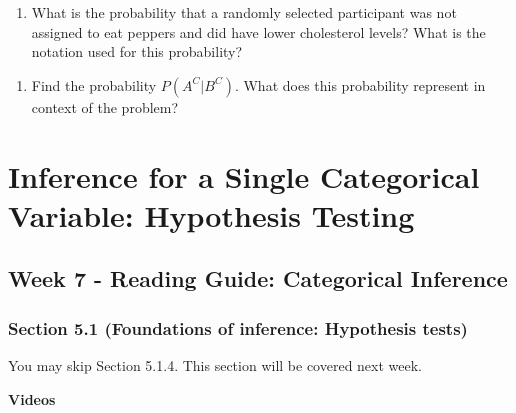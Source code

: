 \documentclass[
]{report}
\providecommand{\tightlist}{%
  \setlength{\itemsep}{0pt}\setlength{\parskip}{0pt}}
\begin{document}
\vspace{0.5in}

\begin{enumerate}
\def\labelenumi{\alph{enumi}.}
\setcounter{enumi}{3}
\tightlist
\item
  What is the probability that a randomly selected participant was not assigned to eat peppers and did have lower cholesterol levels? What is the notation used for this probability?
\end{enumerate}

\vspace{0.5in}

\begin{enumerate}
\def\labelenumi{\alph{enumi}.}
\setcounter{enumi}{4}
\tightlist
\item
  Find the probability \(P(A^C | B^C)\). What does this probability represent in context of the problem?
\end{enumerate}

\vspace{0.5in}

\newpage

\hypertarget{inference-for-a-single-categorical-variable-hypothesis-testing}{%
\chapter{Inference for a Single Categorical Variable: Hypothesis Testing}\label{inference-for-a-single-categorical-variable-hypothesis-testing}}

\hypertarget{week-7---reading-guide-categorical-inference}{%
\section{Week 7 - Reading Guide: Categorical Inference}\label{week-7---reading-guide-categorical-inference}}

\hypertarget{section-5.1-foundations-of-inference-hypothesis-tests}{%
\subsection*{Section 5.1 (Foundations of inference: Hypothesis tests)}\label{section-5.1-foundations-of-inference-hypothesis-tests}}

You may skip Section 5.1.4. This section will be covered next week.

\textbf{Videos}
\end{document}
